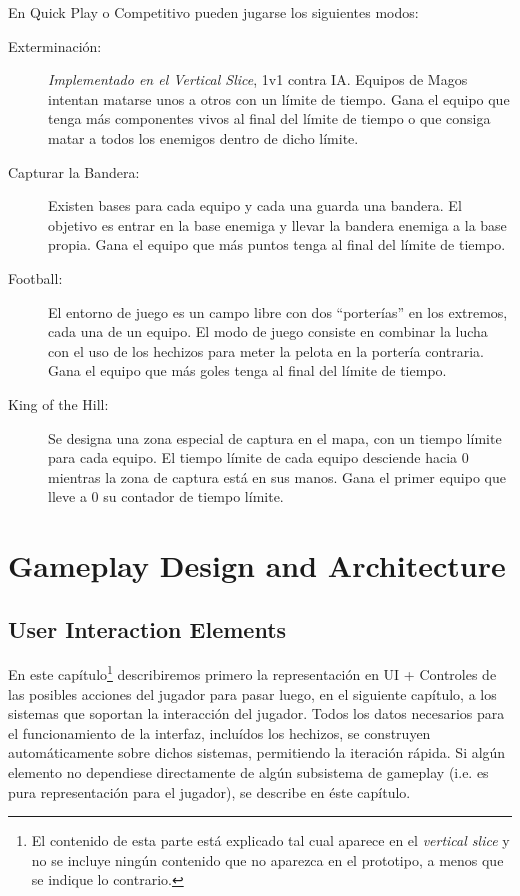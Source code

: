 \documentclass[12pt]{report}
\newcommand*\cleartoleftpage{%
  \clearpage
  \ifodd\value{page}\hbox{}\newpage\fi
}
\begin{document}
En Quick Play o Competitivo pueden jugarse los siguientes modos:

\begin{description}
\item[Exterminación:] \textit{Implementado en el Vertical Slice}, 1v1 contra IA. Equipos de Magos intentan matarse unos a otros con un límite de tiempo. Gana el equipo que tenga más componentes vivos al final del límite de tiempo o que consiga matar a todos los enemigos dentro de dicho límite.
\item[Capturar la Bandera:] Existen bases para cada equipo y cada una guarda una bandera. El objetivo es entrar en la base enemiga y llevar la bandera enemiga a la base propia. Gana el equipo que más puntos tenga al final del límite de tiempo.
\item[Football:] El entorno de juego es un campo libre con dos ``porterías'' en los extremos, cada una de un equipo. El modo de juego consiste en combinar la lucha con el uso de los hechizos para meter la pelota en la portería contraria. Gana el equipo que más goles tenga al final del límite de tiempo.
\item[King of the Hill:] Se designa una zona especial de captura en el mapa, con un tiempo límite para cada equipo. El tiempo límite de cada equipo desciende hacia 0 mientras la zona de captura está en sus manos. Gana el primer equipo que lleve a 0 su contador de tiempo límite.
\end{description}

\cleartoleftpage

\part{Gameplay Design and Architecture}

\chapter{User Interaction Elements}

En este capítulo\footnote{El contenido de esta parte está explicado tal cual aparece en el \textit{vertical slice} y no se incluye ningún contenido que no aparezca en el prototipo, a menos que se indique lo contrario.} describiremos primero la representación en UI + Controles de las posibles acciones del jugador para pasar luego, en el siguiente capítulo, a los sistemas que soportan la interacción del jugador. Todos los datos necesarios para el funcionamiento de la interfaz, incluídos los hechizos, se construyen automáticamente sobre dichos sistemas, permitiendo la iteración rápida. Si algún elemento no dependiese directamente de algún subsistema de gameplay (i.e. es pura representación para el jugador), se describe en éste capítulo.
\end{document}
